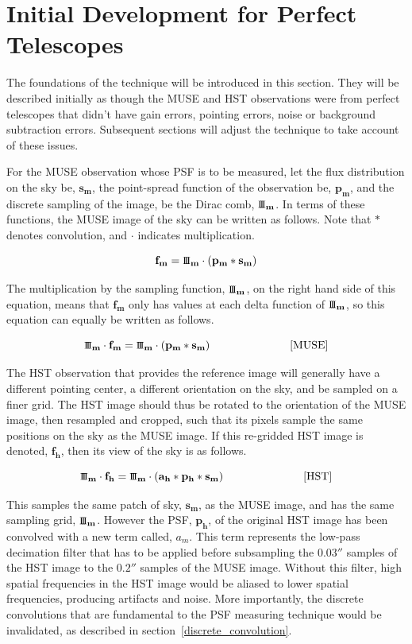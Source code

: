 \documentclass[12pt,twoside,a4paper]{article}
\newcommand{\sha}{\mbox{\small I\!I\!I}}
\newcommand{\arcsec}{''}
\newcommand{\msky}{\mathbf{s_m}}
\newcommand{\mpsf}{\mathbf{p_m}}
\newcommand{\hpsf}{\mathbf{p_h}}
\newcommand{\hlpf}{\mathbf{a_h}}
\newcommand{\mimg}{\mathbf{f_m}}
\newcommand{\himg}{\mathbf{f_h}}
\newcommand{\msha}{\mathbf{\sha_m}}
\begin{document}
\section{Initial Development for Perfect Telescopes}

The foundations of the technique will be introduced in this
section. They will be described initially as though the MUSE and HST
observations were from perfect telescopes that didn't have gain
errors, pointing errors, noise or background subtraction
errors. Subsequent sections will adjust the technique to take account
of these issues.

For the MUSE observation whose PSF is to be measured, let the flux
distribution on the sky be, $\msky$, the point-spread function of the
observation be, $\mpsf$, and the discrete sampling of the image, be
the Dirac comb, $\msha$. In terms of these functions, the MUSE image
of the sky can be written as follows. Note that $\ast$ denotes
convolution, and $\cdot$ indicates multiplication.

\begin{equation}
\mimg = \msha\cdot (\mpsf \ast \msky)
\end{equation}

The multiplication by the sampling function, $\msha$, on the right
hand side of this equation, means that $\mimg$ only has values at each
delta function of $\msha$, so this equation can equally be written as
follows.

\begin{equation}
\label{muse_image_eqn}
\msha \cdot \mimg = \msha\cdot (\mpsf \ast \msky) \hspace{1in} \mbox{[MUSE]}
\end{equation}

The HST observation that provides the reference image will generally
have a different pointing center, a different orientation on the sky,
and be sampled on a finer grid. The HST image should thus be rotated
to the orientation of the MUSE image, then resampled and cropped, such
that its pixels sample the same positions on the sky as the MUSE
image. If this re-gridded HST image is denoted, $\himg$, then its view
of the sky is as follows.

\begin{equation}
\label{hst_image_eqn}
\msha \cdot \himg = \msha \cdot (\hlpf \ast \hpsf \ast \msky) \hspace{1in} \mbox{[HST]}
\end{equation}

This samples the same patch of sky, $\msky$, as the MUSE image, and
has the same sampling grid, $\msha$. However the PSF, $\hpsf$, of the
original HST image has been convolved with a new term called,
$a_m$. This term represents the low-pass decimation filter that has to
be applied before subsampling the $0.03\arcsec$ samples of the HST
image to the $0.2\arcsec$ samples of the MUSE image. Without this
filter, high spatial frequencies in the HST image would be aliased to
lower spatial frequencies, producing artifacts and noise. More
importantly, the discrete convolutions that are fundamental to the PSF
measuring technique would be invalidated, as described in
section~\ref{discrete_convolution}.
\end{document}
